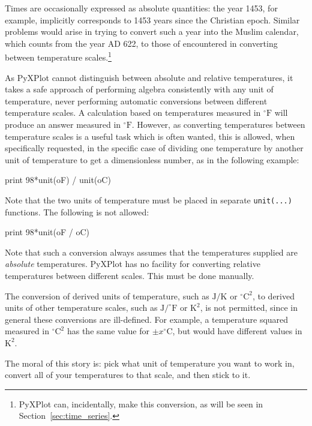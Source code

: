 Times are occasionally expressed as absolute quantities: the year 1453, for
example, implicitly corresponds to 1453 years since the Christian epoch.
Similar problems would arise in trying to convert such a year into the Muslim
calendar, which counts from the year {\footnotesize AD} 622, to those of
encountered in converting between temperature scales.\footnote{PyXPlot can,
incidentally, make this conversion, as will be seen in
Section~\ref{sec:time_series}.}

As PyXPlot cannot distinguish between absolute and relative temperatures, it
takes a safe approach of performing algebra consistently with any unit of
temperature, never performing automatic conversions between different
temperature scales. A calculation based on temperatures measured in
$^\circ\mathrm{F}$ will produce an answer measured in $^\circ\mathrm{F}$.
However, as converting temperatures between temperature scales is a useful task
which is often wanted, this is allowed, when specifically requested, in the
specific case of dividing one temperature by another unit of temperature to get
a dimensionless number, as in the following example:

\begin{dodo}
print 98*unit(oF) / unit(oC)
\end{dodo}

\noindent Note that the two units of temperature must be placed in separate
{\tt unit(...)} functions. The following is not allowed:

\begin{dontdo}
print 98*unit(oF / oC)
\end{dontdo}

Note that such a conversion always assumes that the temperatures supplied are
{\it absolute} temperatures. PyXPlot has no facility for converting relative
temperatures between different scales. This must be done manually.

The conversion of derived units of temperature, such as $\mathrm{J}/\mathrm{K}$ or
$^\circ\mathrm{C}^2$, to derived units of other temperature scales, such as
$\mathrm{J}/^\circ\mathrm{F}$ or $\mathrm{K}^2$, is not permitted, since in
general these conversions are ill-defined. For example, a temperature squared
measured in $^\circ\mathrm{C}^2$ has the same value for $\pm
x^\circ\mathrm{C}$, but would have different values in $\mathrm{K}^2$.

The moral of this story is: pick what unit of temperature you want to work in,
convert all of your temperatures to that scale, and then stick to it.

